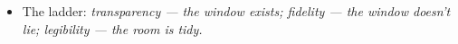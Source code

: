\begin{itemize}
    \item The ladder: \emph{transparency — the window exists; fidelity — the window doesn't lie; legibility — the room is tidy.} 

\end{itemize}
